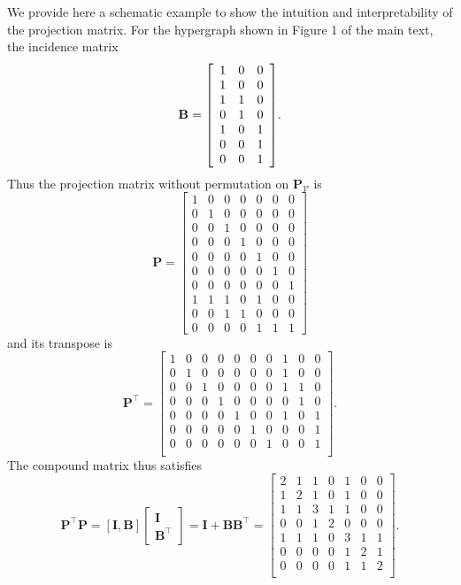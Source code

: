 \documentclass[review]{elsarticle}
\begin{document}
We provide here a schematic example to show the intuition and interpretability of the projection matrix. For the hypergraph shown in Figure 1 of the main text, the incidence matrix
$$
\mathbf{B}={\left[\begin{array}{l l l}
  {1}&{0}&{0}\\
  {1}&{0}&{0}\\
  {1}&{1}&{0}\\
  {0}&{1}&{0}\\
  {1}&{0}&{1}\\
  {0}&{0}&{1}\\
  {0}&{0}&{1}\\
\end{array}\right]}.
$$
Thus the projection matrix without permutation on $\mathbf{P}_\mathcal{V}$ is
$$
\mathbf{P}=\left[\begin{array}{lllllll}
1 & 0 & 0 & 0 & 0 & 0 & 0 \\
0 & 1 & 0 & 0 & 0 & 0 & 0 \\
0 & 0 & 1 & 0 & 0 & 0 & 0 \\
0 & 0 & 0 & 1 & 0 & 0 & 0 \\
0 & 0 & 0 & 0 & 1 & 0 & 0 \\
0 & 0 & 0 & 0 & 0 & 1 & 0 \\
0 & 0 & 0 & 0 & 0 & 0 & 1 \\
1 & 1 & 1 & 0 & 1 & 0 & 0 \\
0 & 0 & 1 & 1 & 0 & 0 & 0 \\
0 & 0 & 0 & 0 & 1 & 1 & 1
\end{array}\right]
$$
and its transpose is
$$
\mathbf{P}^{\top}=\left[\begin{array}{llllllllll}
1 & 0 & 0 & 0 & 0 & 0 & 0 & 1 & 0 & 0\\
0 & 1 & 0 & 0 & 0 & 0 & 0 & 1 & 0 & 0\\
0 & 0 & 1 & 0 & 0 & 0 & 0 & 1 & 1 & 0\\
0 & 0 & 0 & 1 & 0 & 0 & 0 & 0 & 1 & 0\\
0 & 0 & 0 & 0 & 1 & 0 & 0 & 1 & 0 & 1\\
0 & 0 & 0 & 0 & 0 & 1 & 0 & 0 & 0 & 1\\
0 & 0 & 0 & 0 & 0 & 0 & 1 & 0 & 0 & 1\\
\end{array}\right].
$$
The compound matrix thus satisfies
$$
\mathbf{P}^{\top}\mathbf{P}=[\mathbf{I},\mathbf{B}]\left[\begin{matrix}\mathbf{I}\\\mathbf{B}^\top\end{matrix}\right]=\mathbf{I}+\mathbf{B}\mathbf{B}^\top=\left[\begin{array}{lllllll}
  2& 1& 1& 0& 1& 0& 0 \\
  1& 2& 1& 0& 1& 0& 0 \\
  1& 1& 3& 1& 1& 0& 0 \\
  0& 0& 1& 2& 0& 0& 0 \\
  1& 1& 1& 0& 3& 1& 1 \\
  0& 0& 0& 0& 1& 2& 1 \\
  0& 0& 0& 0& 1& 1& 2 \\
\end{array}\right].
$$
\end{document}
